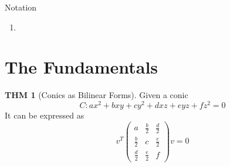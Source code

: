\documentclass[twocolumn]{article}
\theoremstyle{definition}
\newtheorem{thm}{THM}
\theoremstyle{remark}
\begin{document}
\begin{fdefi}{Notation}{}
	\begin{enumerate}
		\item
	\end{enumerate}
\end{fdefi}
\hrulefill

\section{The Fundamentals}

\begin{thm}[Conics as Bilinear Forms]
	Given a conic
	$$
	C : ax^2 + bxy + cy^2 + dxz + e yz + fz^2 = 0
	$$
	It can be expressed as 
	\begin{dmath*}
	v^T 
	\begin{pmatrix}
		a & \frac{b}{2} & \frac{d}{2} \\
		\frac{b}{2} & c & \frac{e}{2} \\
		\frac{d}{2} & \frac{e}{2} & f
	\end{pmatrix}
	v = 0
	\end{dmath*}
\end{thm}
\end{document}
